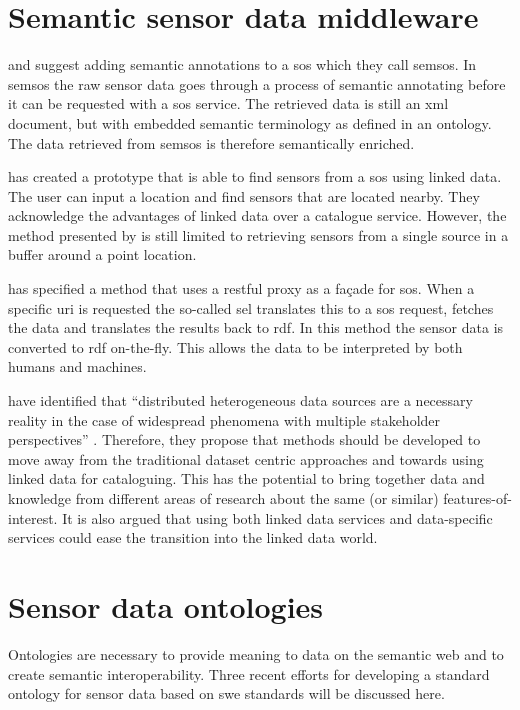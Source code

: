 \section{Semantic sensor data middleware}
\cite{SSW:Henson} and \cite{SSW:Pschorr} suggest adding semantic annotations to a \ac{sos} which they call \ac{semsos}. In \ac{semsos} the raw sensor data goes through a process of semantic annotating before it can be requested with a \ac{sos} service. The retrieved data is still an \ac{xml} document, but with embedded semantic terminology as defined in an ontology. The data retrieved from \ac{semsos} is therefore semantically enriched.  

\cite{SSW:Pschorr2} has created a prototype that is able to find sensors from a \ac{sos} using linked data. The user can input a location and find sensors that are located nearby. They acknowledge the advantages of linked data over a catalogue service. However, the method presented by \cite{SSW:Pschorr2} is still limited to retrieving sensors from a single source in a buffer around a point location.  

\cite{SSW:Janowicz} has specified a method that uses a \ac{rest}ful proxy as a fa\c{c}ade for \ac{sos}. When a specific \ac{uri} is requested the so-called \ac{sel} translates this to a \ac{sos} request, fetches the data and translates the results back to \ac{rdf}. In this method the sensor data is converted to \ac{rdf} on-the-fly. This allows the data to be interpreted by both humans and machines.  

\cite{SSW:Atkinson} have identified that \enquote{distributed heterogeneous data sources are a necessary reality in the case of widespread phenomena with multiple stakeholder perspectives} \cite[p.129]{SSW:Atkinson}. Therefore, they propose that methods should be developed to move away from the traditional dataset centric approaches and towards using linked data for cataloguing. This has the potential to bring together data and knowledge from different areas of research about the same (or similar) features-of-interest. It is also argued that using both linked data services and data-specific services could ease the transition into the linked data world.  

\section{Sensor data ontologies}

Ontologies are necessary to provide meaning to data on the semantic web and to create semantic interoperability. Three recent efforts for developing a standard ontology for sensor data based on \ac{swe} standards will be discussed here.

